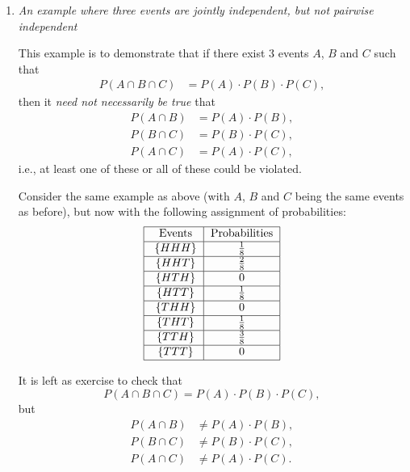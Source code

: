 \documentclass[12pt]{article}
\begin{document}
\begin{enumerate}
\item \emph{An example where three events are jointly independent, but not pairwise independent}\\

\par This example is to demonstrate that if there exist $3$ events $A$, $B$ and $C$ such that
\begin{align}
P(A\cap B\cap C)&=P(A)\cdot P(B)\cdot P(C),\nonumber
\end{align}
then it \emph{need not necessarily be true} that 
\begin{align}
P(A\cap B)&=P(A)\cdot P(B),\nonumber\\
P(B\cap C)&=P(B)\cdot P(C),\nonumber\\
P(A\cap C)&=P(A)\cdot P(C),\nonumber
\end{align} 
i.e., at least one of these or all of these could be violated.

Consider the same example as above (with $A$, $B$ and $C$ being the same events as before), but now with the following assignment of probabilities:
\[\centering
\begin{tabular}{|c|c|}
\hline 
\rule[-1ex]{0pt}{2.5ex} Events & Probabilities \\ 
\hline 
\rule[-1ex]{0pt}{2.5ex} $ \{HHH\} $ & $ \frac{1}{8} $ \\ 
\hline 
\rule[-1ex]{0pt}{2.5ex}  $ \{HHT\} $ & $ \frac{2}{8} $  \\ 
\hline 
\rule[-1ex]{0pt}{2.5ex}  $ \{HTH\} $ & $ 0 $  \\ 
\hline 
\rule[-1ex]{0pt}{2.5ex}  $ \{HTT\} $ & $ \frac{1}{8} $  \\ 
\hline 
\rule[-1ex]{0pt}{2.5ex}  $ \{THH\} $ & $ 0 $  \\ 
\hline 
\rule[-1ex]{0pt}{2.5ex}  $ \{THT\} $ & $ \frac{1}{8} $  \\ 
\hline 
\rule[-1ex]{0pt}{2.5ex}  $ \{TTH\} $ & $ \frac{3}{8} $  \\ 
\hline 
\rule[-1ex]{0pt}{2.5ex}  $ \{TTT\} $ & $ 0 $  \\ 
\hline 
\end{tabular} 
\]

It is left as exercise to check that 
\begin{equation}
P(A\cap B\cap C)=P(A)\cdot P(B)\cdot P(C),\nonumber
\end{equation}
but 
\begin{align}
P(A\cap B)&\neq P(A)\cdot P(B),\nonumber\\
P(B\cap C)&\neq P(B)\cdot P(C),\nonumber\\
P(A\cap C)&\neq P(A)\cdot P(C)\nonumber.
\end{align}



\end{enumerate}
\end{document}
